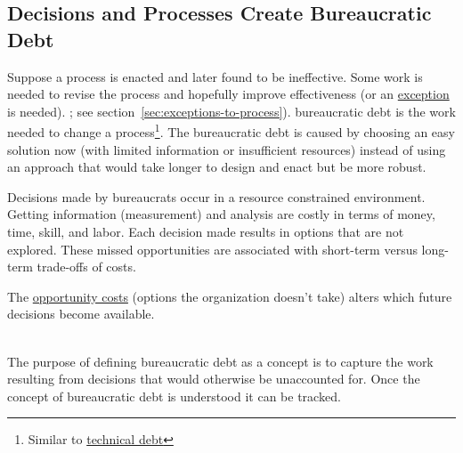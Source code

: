 \subsection*{Decisions and Processes Create Bureaucratic Debt\label{sec:bureaucratic-debt}}


Suppose a \gls{process} is enacted and later found to be ineffective. Some work is needed to revise the process and hopefully improve effectiveness (or an \hyperref[sec:exceptions-to-process]{exception} is needed).
\ifsectionref
; see section~\ref{sec:exceptions-to-process}).
\fi
\gls{bureaucratic debt} is 
 the work needed to change a process\footnote{Similar to \href{https://en.wikipedia.org/wiki/Technical_debt}{technical debt}
}. 
The bureaucratic debt is caused by choosing an easy solution now (with limited information or insufficient resources) instead of using an approach that would take longer to design and enact but be more robust.


Decisions made by \glspl{bureaucrat} occur in a resource constrained environment.
Getting information (measurement) and analysis are costly in terms of money, time, skill, and labor.
Each decision made results in options that are not explored. These missed opportunities are associated with short-term versus long-term trade-offs of costs.

The \href{https://en.wikipedia.org/wiki/Opportunity_cost}{opportunity costs}
(options the organization doesn't take) alters which future decisions become available.

\ \\

The purpose of defining bureaucratic debt as a concept is to capture the work resulting from decisions that would otherwise be unaccounted for.
Once the concept of bureaucratic debt is understood it can be tracked.

